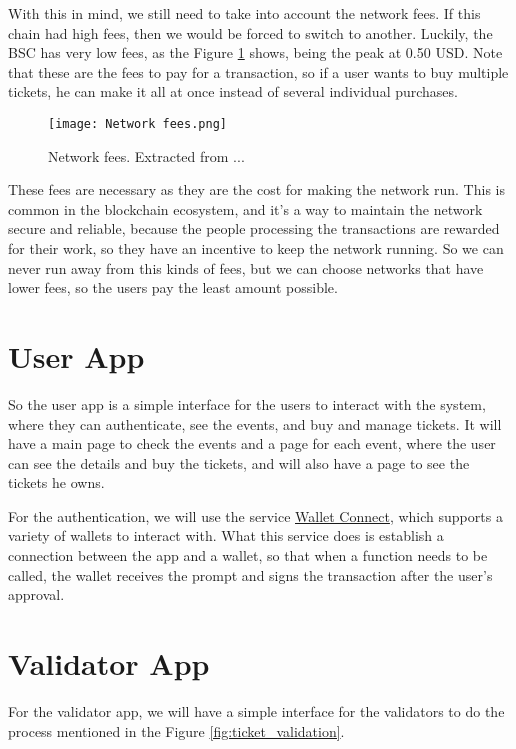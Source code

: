 With this in mind, we still need to take into account the network fees. If this chain had high fees, then we would be forced to switch to another. Luckily, the BSC has very low fees, as the Figure \ref{fig:network_fees} shows, being the peak at 0.50 USD. Note that these are the fees to pay for a transaction, so if a user wants to buy multiple tickets, he can make it all at once instead of several individual purchases.

\begin{figure}[H]
    \texttt{[image: Network fees.png]}
    \centering
    \caption{Network fees. Extracted from ...}
    \label{fig:network_fees}
\end{figure}

These fees are necessary as they are the cost for making the network run. This is common in the blockchain ecosystem, and it's a way to maintain the network secure and reliable, because the people processing the transactions are rewarded for their work, so they have an incentive to keep the network running. So we can never run away from this kinds of fees, but we can choose networks that have lower fees, so the users pay the least amount possible.

\section{User App}
\label{sec:user_app}

So the user app is a simple interface for the users to interact with the system, where they can authenticate, see the events, and buy and manage tickets. It will have a main page to check the events and a page for each event, where the user can see the details and buy the tickets, and will also have a page to see the tickets he owns.

For the authentication, we will use the service \href{https://walletconnect.com/}{Wallet Connect}, which supports a variety of wallets to interact with. What this service does is establish a connection between the app and a wallet, so that when a function needs to be called, the wallet receives the prompt and signs the transaction after the user's approval.

\section{Validator App}
\label{sec:validator_app}

For the validator app, we will have a simple interface for the validators to do the process mentioned in the Figure \ref{fig:ticket_validation}.

